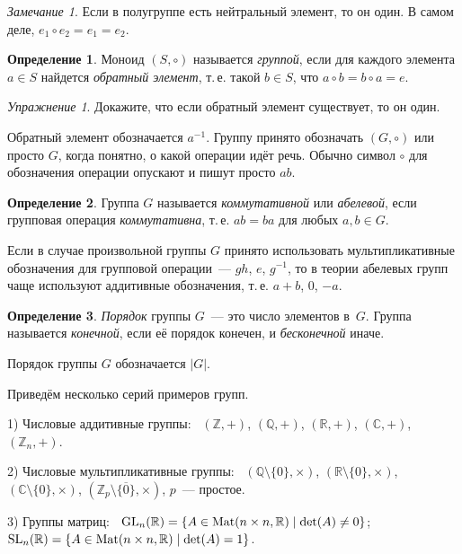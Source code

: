 \documentclass[a4paper,10pt]{amsart}
\def\Mat{{\rm Mat}}%
\def\CC{{\mathbb C}}%
\def\ZZ{{\mathbb Z}}%
\def\RR{{\mathbb R}}%
\def\QQ{{\mathbb Q}}%
\def\GL{{\rm GL}}%
\def\SL{{\rm SL}}%
\def\GL{{\rm GL}}%
\def\Mat{{\rm Mat}}
\def\GL{{\rm GL}}
\def\SL{{\rm SL}}
\def\GL{{\rm GL}}
\theoremstyle{definition}
\newtheorem{definition}{Определение}
\theoremstyle{remark}
\newtheorem{exc}{Упражнение}
\newtheorem{remark}{Замечание}
\begin{document}
\begin{remark}
Если в полугруппе есть нейтральный элемент, то он один. В самом
деле, $e_1\circ e_2=e_1=e_2$.
\end{remark}

\begin{definition}
Моноид $(S,\circ)$ называется {\it группой}, если для каждого
элемента $a\in S$ найдется {\it обратный элемент}, т.\,е. такой
$b\in S$, что $a\circ b = b\circ a= e$.
\end{definition}

\begin{exc}
Докажите, что если обратный элемент существует, то он один.
\end{exc}

Обратный элемент обозначается $a^{-1}$. Группу принято обозначать
$(G,\circ)$ или просто $G$, когда понятно, о какой операции идёт
речь. Обычно символ $\circ$ для обозначения операции опускают и
пишут просто $ab$.

\begin{definition}
Группа $G$ называется {\it коммутативной} или {\it абелевой}, если
групповая операция {\it коммутативна}, т.\,е. $ab=ba$ для любых
$a,b\in G$.
\end{definition}

Если в случае произвольной группы $G$ принято использовать
мультипликативные обозначения для групповой операции~--- $gh$, $e$,
$g^{-1}$, то в теории абелевых групп чаще используют аддитивные
обозначения, т.\,е. $a+b$, $0$, $-a$.

\begin{definition}
{\it Порядок} группы $G$~--- это число элементов в~$G$. Группа
называется {\it конечной}, если её порядок конечен, и {\it
бесконечной} иначе.
\end{definition}

Порядок группы $G$ обозначается $|G|$.

\smallskip

Приведём несколько серий примеров групп.

\smallskip

1) Числовые аддитивные группы: \ $(\ZZ,+)$, $(\QQ,+)$, $(\RR,+)$,
$(\CC,+)$, $(\ZZ_n,+)$.

\smallskip

2) Числовые мультипликативные группы: \
$(\QQ\setminus\{0\},\times)$, $(\RR\setminus\{0\},\times)$,
$(\CC\setminus\{0\},\times)$,
$(\ZZ_p\setminus\{\overline{0}\},\times)$, $p$~--- простое.

3) Группы матриц: \ $\GL_n(\RR)=\{A\in\Mat(n\times n, \RR) \mid
\det(A)\ne 0\}$;  \ $\SL_n(\RR)=\{A\in\Mat(n\times n, \RR) \mid
\det(A)=1\}$.
\end{document}
